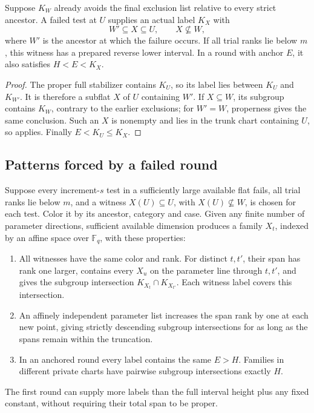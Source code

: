 \begin{lemma}\label{c:prepared-witness}
Suppose $K_W$ already avoids the final exclusion list relative to every
strict ancestor. A failed test at $U$ supplies an actual label $K_X$ with
\[
 W'\subseteq X\subseteq U,\qquad X\not\subseteq W,
\]
where $W'$ is the ancestor at which the failure occurs. If all trial
ranks lie below $m$, this witness has a prepared reverse lower interval.
In a round with anchor $E$, it also satisfies $H<E<K_X$.
\end{lemma}

\begin{proof}
The proper full stabilizer contains $K_U$, so its label lies between
$K_U$ and $K_{W'}$. It is therefore a subflat $X$ of $U$ containing $W'$.
If $X\subseteq W$, its subgroup contains $K_W$, contrary to the earlier
exclusions; for $W'=W$, properness gives the same conclusion.
Such an $X$ is nonempty and lies in the trunk chart containing $U$, so
 applies. Finally $E<K_U\le K_X$.
\end{proof}

\subsection{Patterns forced by a failed round}

\begin{lemma}\label{c:failed-pattern}
Suppose every increment-$s$ test in a sufficiently large available flat
fails, all trial ranks lie below $m$, and a witness
$X(U)\subseteq U$, with $X(U)\not\subseteq W$, is chosen for each test.
Color it by its ancestor, category and case. Given any finite number of
parameter directions, sufficient available dimension produces a family
$X_t$, indexed by an affine space over $\mathbb F_q$, with these properties:
\begin{enumerate}[label=\textup{(\roman*)}]
\item All witnesses have the same color and rank. For distinct $t,t'$,
their span has rank one larger, contains every $X_u$ on the parameter
line through $t,t'$, and gives the subgroup intersection
$K_{X_t}\cap K_{X_{t'}}$. Each witness label covers this intersection.
\item An affinely independent parameter list increases the span rank by
one at each new point, giving strictly descending subgroup intersections
for as long as the spans remain within the truncation.
\item In an anchored round every label contains the same $E>H$.
Families in different private charts have pairwise subgroup
intersections exactly $H$.
\end{enumerate}
The first round can supply more labels than the full interval height
plus any fixed constant, without requiring their total span to be proper.
\end{lemma}

